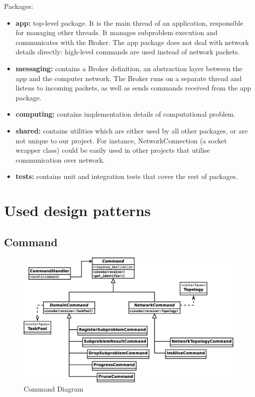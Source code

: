 \documentclass{article}
\begin{document}
Packages:
\begin{itemize}
    \item \textbf{app:} top-level package. It is the main thread of an application, responsible for managing other threads. It manages subproblem execution and communicates with the Broker. 
    The app package does not deal with network details directly: high-level commands are used instead of network packets.
    \item \textbf{messaging:} contains a Broker definition, an abstraction layer between the app and the computer network. 
    The Broker runs on a separate thread and listens to incoming packets, as well as sends commands received from the app package.
    \item \textbf{computing:} contains implementation details of computational problem.
    \item \textbf{shared:} contains utilities which are either used by all other packages, or are not unique to our project. 
    For instance, NetworkConnection (a socket wrapper class) could be easily used in other projects that utilise communication over network.
    \item \textbf{tests:} contains unit and integration tests that cover the rest of packages.
\end{itemize}

\section{Used design patterns}
\subsection{Command}
\begin{figure}[H]
	\centering
	\includegraphics[width=\linewidth]{../diagrams/CommandDiagram.eps}
	\caption{Command Diagram}
\end{figure}
\end{document}
